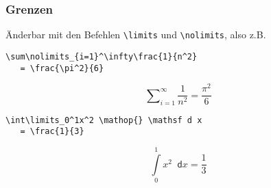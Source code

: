 \begin{frame}[fragile]
  \frametitle{Grenzen}

  \onslide<+->

  Änderbar mit den Befehlen \lstinline{\limits} und \lstinline{\nolimits}, also z.B.

\begin{lstlisting}
\sum\nolimits_{i=1}^\infty\frac{1}{n^2}
   = \frac{\pi^2}{6}
\end{lstlisting}

  \begin{equation*}
    \sum\nolimits_{i=1}^\infty\frac{1}{n^2} = \frac{\pi^2}{6}
  \end{equation*}

  \bigskip

  \onslide<+->

\begin{lstlisting}
\int\limits_0^1x^2 \mathop{} \mathsf d x
   = \frac{1}{3}
\end{lstlisting}

  \begin{equation*}
    \int\limits_0^1 x^2 \mathop{} \mathsf d x = \frac{1}{3}
  \end{equation*}

\end{frame}

